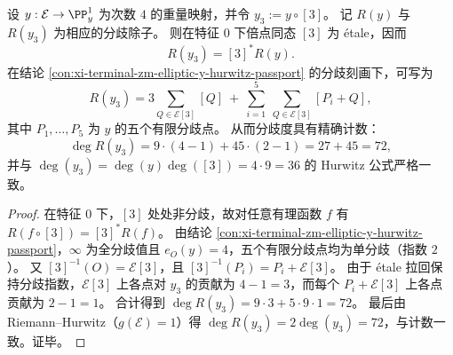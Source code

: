 \begin{corollary}\label{cor:xi-terminal-zm-elliptic-weight-tripling-ramification-count}
设 \(y:\mathcal E\to\PP^1_y\) 为次数 \(4\) 的重量映射，并令 \(y_3:=y\circ[3]\)。
记 \(R(y)\) 与 \(R(y_3)\) 为相应的分歧除子。
则在特征 \(0\) 下倍点同态 \([3]\) 为 \'etale，因而
\[
R(y_3)=[3]^*R(y).
\]
在结论 \ref{con:xi-terminal-zm-elliptic-y-hurwitz-passport} 的分歧刻画下，可写为
\[
R(y_3)=3\sum_{Q\in \mathcal E[3]}[Q]\ +\ \sum_{i=1}^{5}\ \sum_{Q\in \mathcal E[3]}[P_i+Q],
\]
其中 \(P_1,\dots,P_5\) 为 \(y\) 的五个有限分歧点。
从而分歧度具有精确计数：
\[
\deg R(y_3)=9\cdot(4-1)+45\cdot(2-1)=27+45=72,
\]
并与 \(\deg(y_3)=\deg(y)\deg([3])=4\cdot 9=36\) 的 Hurwitz 公式严格一致。
\end{corollary}
\begin{proof}
在特征 \(0\) 下，\([3]\) 处处非分歧，故对任意有理函数 \(f\) 有 \(R(f\circ[3])=[3]^*R(f)\)。
由结论 \ref{con:xi-terminal-zm-elliptic-y-hurwitz-passport}，\(\infty\) 为全分歧值且 \(e_O(y)=4\)，五个有限分歧点均为单分歧（指数 \(2\)）。
又 \([3]^{-1}(O)=\mathcal E[3]\)，且 \([3]^{-1}(P_i)=P_i+\mathcal E[3]\)。
由于 \'etale 拉回保持分歧指数，\(\mathcal E[3]\) 上各点对 \(y_3\) 的贡献为 \(4-1=3\)，而每个 \(P_i+\mathcal E[3]\) 上各点贡献为 \(2-1=1\)。
合计得到 \(\deg R(y_3)=9\cdot 3+5\cdot 9\cdot 1=72\)。
最后由 Riemann--Hurwitz（\(g(\mathcal E)=1\)）得 \(\deg R(y_3)=2\deg(y_3)=72\)，与计数一致。证毕。
\end{proof}

\endinput
